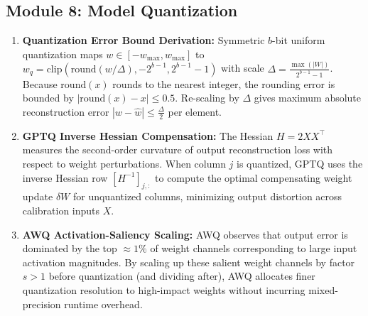 \documentclass[11pt,a4paper]{article}
\begin{document}
	\subsection*{Module 8: Model Quantization}
	\begin{enumerate}
		\item \textbf{Quantization Error Bound Derivation:} Symmetric $b$-bit uniform quantization maps $w \in [-w_{\max}, w_{\max}]$ to $w_q = \mathrm{clip}(\mathrm{round}(w/\Delta), -2^{b-1}, 2^{b-1}-1)$ with scale $\Delta = \frac{\max(|W|)}{2^{b-1}-1}$. Because $\mathrm{round}(x)$ rounds to the nearest integer, the rounding error is bounded by $|\mathrm{round}(x) - x| \le 0.5$. Re-scaling by $\Delta$ gives maximum absolute reconstruction error $|w - \hat{w}| \le \frac{\Delta}{2}$ per element.
		\item \textbf{GPTQ Inverse Hessian Compensation:} The Hessian $H = 2 X X^\top$ measures the second-order curvature of output reconstruction loss with respect to weight perturbations. When column $j$ is quantized, GPTQ uses the inverse Hessian row $[H^{-1}]_{j,:}$ to compute the optimal compensating weight update $\delta W$ for unquantized columns, minimizing output distortion across calibration inputs $X$.
		\item \textbf{AWQ Activation-Saliency Scaling:} AWQ observes that output error is dominated by the top $\approx 1\%$ of weight channels corresponding to large input activation magnitudes. By scaling up these salient weight channels by factor $s > 1$ before quantization (and dividing after), AWQ allocates finer quantization resolution to high-impact weights without incurring mixed-precision runtime overhead.
	\end{enumerate}
\end{document}
